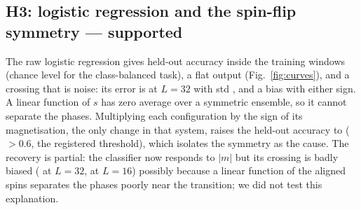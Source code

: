\begin{table}[t]\centering\caption{Paired Wilcoxon tests over seeds (second column: first minus second; ``seeds first lower'' counts out of ten).}\label{tab:tests}
\resizebox{\columnwidth}{!}{}
\end{table}

\subsection{H3: logistic regression and the spin-flip symmetry --- supported}
The raw logistic regression gives held-out accuracy  inside the training windows (chance level for the class-balanced task), a flat output (Fig.~\ref{fig:curves}), and a crossing that is noise: its error is  at $L=32$ with std , and a bias with either sign. A linear function of $s$ has zero average over a symmetric ensemble, so it cannot separate the phases. Multiplying each configuration by the sign of its magnetisation, the only change in that system, raises the held-out accuracy to  ($>0.6$, the registered threshold), which isolates the symmetry as the cause. The recovery is partial: the classifier now responds to $|m|$ but its crossing is badly biased ( at $L=32$,  at $L=16$) possibly because a linear function of the aligned spins separates the phases poorly near the transition; we did not test this explanation.

